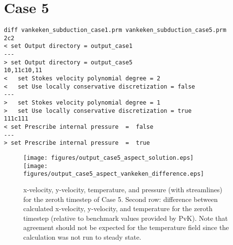 \documentclass[11pt,letterpaper]{article}
\begin{document}
\section{Case 5}
\begin{verbatim}
diff vankeken_subduction_case1.prm vankeken_subduction_case5.prm
2c2
< set Output directory = output_case1
---
> set Output directory = output_case5
10,11c10,11
<   set Stokes velocity polynomial degree = 2
<   set Use locally conservative discretization = false
---
>   set Stokes velocity polynomial degree = 1
>   set Use locally conservative discretization = true
111c111
< set Prescribe internal pressure  =  false
---
> set Prescribe internal pressure  =  true
\end{verbatim}
\begin{figure}[!htb]
\texttt{[image: figures/output\_case5\_aspect\_solution.eps]}\\
\texttt{[image: figures/output\_case5\_aspect\_vankeken\_difference.eps]}
\caption{x-velocity, y-velocity, temperature, and pressure (with streamlines) for the zeroth timestep of Case 5. Second row: difference between calculated x-velocity, y-velocity, and temperature for the zeroth timestep (relative to benchmark values provided by PvK). Note that agreement should not be expected for the temperature field since the calculation was not run to steady state.}
\end{figure}
\end{document}
